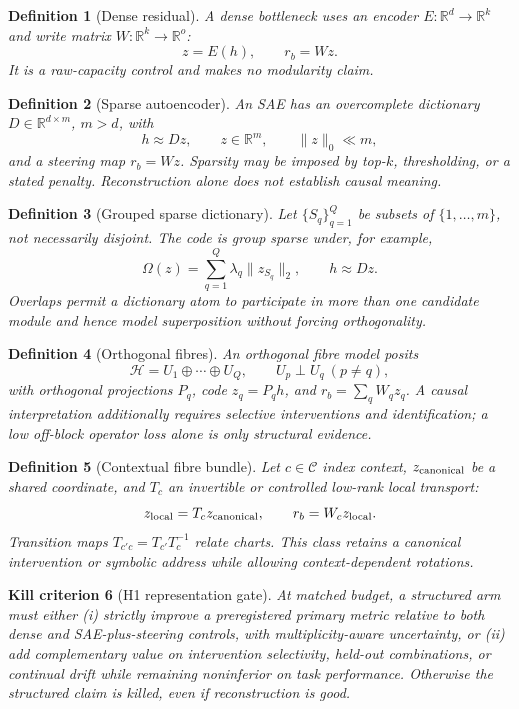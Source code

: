 \documentclass[11pt]{article}
\newtheorem{definition}{Definition}[section]
\newtheorem{criterion}[definition]{Kill criterion}
\newcommand{\cH}{\mathcal H}
\newcommand{\R}{\mathbb R}
\begin{document}
\begin{definition}[Dense residual]
A dense bottleneck uses an encoder $E:\R^d\to\R^k$ and write matrix
$W:\R^k\to\R^o$:
\[
 z=E(h),\qquad r_b=Wz.
\]
It is a raw-capacity control and makes no modularity claim.
\end{definition}

\begin{definition}[Sparse autoencoder]
An SAE has an overcomplete dictionary $D\in\R^{d\times m}$, $m>d$, with
\[
 h\approx Dz,\qquad z\in\R^m,\qquad \|z\|_0\ll m,
\]
and a steering map $r_b=Wz$.  Sparsity may be imposed by top-$k$, thresholding,
or a stated penalty.  Reconstruction alone does not establish causal meaning.
\end{definition}

\begin{definition}[Grouped sparse dictionary]
Let $\{S_q\}_{q=1}^Q$ be subsets of $\{1,\ldots,m\}$, not necessarily
disjoint.  The code is group sparse under, for example,
\[
 \Omega(z)=\sum_{q=1}^Q\lambda_q\|z_{S_q}\|_2,
\qquad h\approx Dz.
\]
Overlaps permit a dictionary atom to participate in more than one candidate
module and hence model superposition without forcing orthogonality.
\end{definition}

\begin{definition}[Orthogonal fibres]
An orthogonal fibre model posits
\[
 \cH=U_1\oplus\cdots\oplus U_Q,\qquad
 U_p\perp U_q\ (p\ne q),
\]
with orthogonal projections $P_q$, code $z_q=P_qh$, and
$r_b=\sum_q W_qz_q$.  A causal interpretation additionally requires selective
interventions and identification; a low off-block operator loss alone is only
structural evidence.
\end{definition}

\begin{definition}[Contextual fibre bundle]
Let $c\in\mathcal C$ index context, $z_{\rm canonical}$ be a shared coordinate,
and $T_c$ an invertible or controlled low-rank local transport:
\[
 z_{\rm local}=T_cz_{\rm canonical},\qquad
 r_b=W_cz_{\rm local}.
\]
Transition maps $T_{c'c}=T_{c'}T_c^{-1}$ relate charts.  This class retains a
canonical intervention or symbolic address while allowing context-dependent
rotations.
\end{definition}

\begin{criterion}[H1 representation gate]
At matched budget, a structured arm must either (i) strictly improve a
preregistered primary metric relative to both dense and SAE-plus-steering
controls, with multiplicity-aware uncertainty, or (ii) add complementary value
on intervention selectivity, held-out combinations, or continual drift while
remaining noninferior on task performance.  Otherwise the structured claim is
killed, even if reconstruction is good.
\end{criterion}
\end{document}
